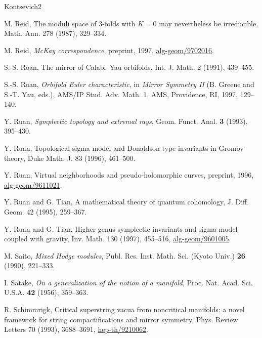 \begin{thebibliography}{Kontsevich2}

\hypertarget{bib:Reid5}{}
M. Reid, The moduli space of 3-folds with $K=0$ may nevertheless be irreducible, Math. Ann. 278 (1987), 329--334.

\hypertarget{bib:Reid6}{} M. Reid, \emph{McKay correspondence}, preprint, 1997, \href{https://arxiv.org/abs/alg-geom/9702016}{alg-geom/9702016}.

\hypertarget{bib:Roan1}{}
S.-S. Roan, The mirror of Calabi--Yau orbifolds,
Int. J. Math. 2 (1991), 439--455.

\hypertarget{bib:Roan2}{} S.-S. Roan, \emph{Orbifold Euler characteristic}, in \emph{Mirror Symmetry II} (B. Greene and S.-T. Yau, eds.), AMS/IP Stud. Adv. Math. 1, AMS, Providence, RI, 1997, 129--140.

\hypertarget{bib:Ruan1}{} Y. Ruan, \emph{Symplectic topology and extremal rays}, Geom. Funct. Anal. \textbf{3} (1993), 395--430.

\hypertarget{bib:Ruan2}{}
Y. Ruan, Topological sigma model and Donaldson type invariants in Gromov theory, Duke Math. J. 83 (1996), 461--500.

\hypertarget{bib:Ruan3}{}
Y. Ruan, Virtual neighborhoods and pseudo-holomorphic curves, preprint, 1996, \href{https://arxiv.org/abs/alg-geom/9611021}{alg-geom/9611021}.

\hypertarget{bib:RT1}{}
Y. Ruan and G. Tian, A mathematical theory of quantum cohomology, J. Diff. Geom. 42 (1995), 259--367.

\hypertarget{bib:RT2}{}
Y. Ruan and G. Tian, Higher genus symplectic invariants and sigma model coupled with gravity, Inv. Math. 130 (1997), 455--516, \href{https://arxiv.org/abs/alg-geom/9601005}{alg-geom/9601005}.

\hypertarget{bib:Saito}{} M. Saito, \emph{Mixed Hodge modules}, Publ. Res. Inst. Math. Sci. (Kyoto Univ.) \textbf{26} (1990), 221--333.

\hypertarget{bib:Satake}{} I. Satake, \emph{On a generalization of the notion of a manifold}, Proc. Nat. Acad. Sci. U.S.A. \textbf{42} (1956), 359--363.

\hypertarget{bib:Schimmrigk}{}
R. Schimmrigk, Critical superstring vacua from noncritical manifolds: a novel framework
for string compactifications and mirror symmetry,
Phys. Review Letters 70 (1993), 3688--3691, \href{https://arxiv.org/abs/hep-th/9210062}{hep-th/9210062}.


\end{thebibliography}
